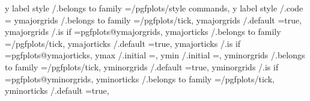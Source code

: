 {{{{{{{{{{y label style                 /.belongs to family                                                                                                                =/pgfplots/style commands,
y label style                 /.code                                                                                                                             ={%
ymajorgrids                   /.belongs to family                                                                                                                =/pgfplots/tick,
ymajorgrids                   /.default                                                                                                                          =true,
ymajorgrids                   /.is if                                                                                                                            =pgfplots@ymajorgrids,
ymajorticks                   /.belongs to family                                                                                                                =/pgfplots/tick,
ymajorticks                   /.default                                                                                                                          =true,
ymajorticks                   /.is if                                                                                                                            =pgfplots@ymajorticks,
ymax                          /.initial                                                                                                                          =,
ymin                          /.initial                                                                                                                          =,
yminorgrids                   /.belongs to family                                                                                                                =/pgfplots/tick,
yminorgrids                   /.default                                                                                                                          =true,
yminorgrids                   /.is if                                                                                                                            =pgfplots@yminorgrids,
yminorticks                   /.belongs to family                                                                                                                =/pgfplots/tick,
yminorticks                   /.default                                                                                                                          =true,
}}}}}}}}}}}
